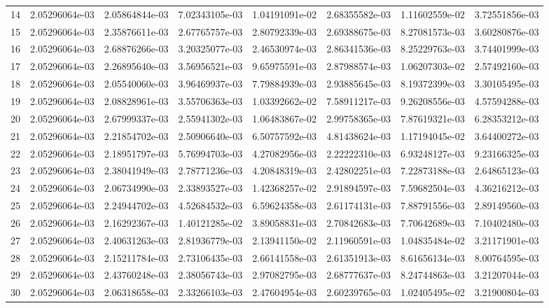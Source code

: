 \documentclass[12pt,a4paper]{article}
\begin{document}
\begin{table}[htbp]
{\begin{tabular}{cccccccc}
14 & 2.05296064e-03 & 2.05864844e-03 & 7.02343105e-03 & 1.04191091e-02 & 2.68355582e-03 & 1.11602559e-02 & 3.72551856e-03 \\
15 & 2.05296064e-03 & 2.35876611e-03 & 2.67765757e-03 & 2.80792339e-03 & 2.69388675e-03 & 8.27081573e-03 & 3.60280876e-03 \\
16 & 2.05296064e-03 & 2.68876266e-03 & 3.20325077e-03 & 2.46530974e-03 & 2.86341536e-03 & 8.25229763e-03 & 3.74401999e-03 \\
17 & 2.05296064e-03 & 2.26895640e-03 & 3.56956521e-03 & 9.65975591e-03 & 2.87988574e-03 & 1.06207303e-02 & 2.57492160e-03 \\
18 & 2.05296064e-03 & 2.05540060e-03 & 3.96469937e-03 & 7.79884939e-03 & 2.93885645e-03 & 8.19372399e-03 & 3.30105495e-03 \\
19 & 2.05296064e-03 & 2.08828961e-03 & 3.55706363e-03 & 1.03392662e-02 & 7.58911217e-03 & 9.26208556e-03 & 4.57594288e-03 \\
20 & 2.05296064e-03 & 2.67999337e-03 & 2.55941302e-03 & 1.06483867e-02 & 2.99758365e-03 & 7.87619321e-03 & 6.28353212e-03 \\
21 & 2.05296064e-03 & 2.21854702e-03 & 2.50906640e-03 & 6.50757592e-03 & 4.81438624e-03 & 1.17194045e-02 & 3.64400272e-03 \\
22 & 2.05296064e-03 & 2.18951797e-03 & 5.76994703e-03 & 4.27082956e-03 & 2.22222310e-03 & 6.93248127e-03 & 9.23166325e-03 \\
23 & 2.05296064e-03 & 2.38041949e-03 & 2.78771236e-03 & 4.20848319e-03 & 2.42802251e-03 & 7.22873188e-03 & 2.64865123e-03 \\
24 & 2.05296064e-03 & 2.06734990e-03 & 2.33893527e-03 & 1.42368257e-02 & 2.91894597e-03 & 7.59682504e-03 & 4.36216212e-03 \\
25 & 2.05296064e-03 & 2.24944702e-03 & 4.52684532e-03 & 6.59624358e-03 & 2.61174131e-03 & 7.88791556e-03 & 2.89149560e-03 \\
26 & 2.05296064e-03 & 2.16292367e-03 & 1.40121285e-02 & 3.89058831e-03 & 2.70842683e-03 & 7.70642689e-03 & 7.10402480e-03 \\
27 & 2.05296064e-03 & 2.40631263e-03 & 2.81936779e-03 & 2.13941150e-02 & 2.11960591e-03 & 1.04835484e-02 & 3.21171901e-03 \\
28 & 2.05296064e-03 & 2.15211784e-03 & 2.73106435e-03 & 2.66141558e-03 & 2.61351913e-03 & 8.61656134e-03 & 8.00764595e-03 \\
29 & 2.05296064e-03 & 2.43760248e-03 & 2.38056743e-03 & 2.97082795e-03 & 2.68777637e-03 & 8.24744863e-03 & 3.21207044e-03 \\
30 & 2.05296064e-03 & 2.06318658e-03 & 2.33266103e-03 & 2.47604954e-03 & 2.60239765e-03 & 1.02405495e-02 & 3.21900804e-03 \\
\bottomrule\end{tabular}}
\end{table}
\clearpage
\end{document}
